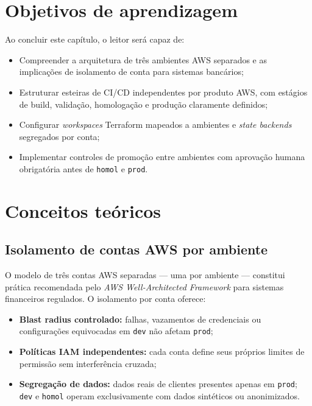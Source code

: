 \section{Objetivos de aprendizagem}

Ao concluir este cap\'itulo, o leitor ser\'a capaz de:

\begin{itemize}[leftmargin=*]
  \item Compreender a arquitetura de tr\^es ambientes AWS separados e
        as implica\c{c}\~oes de isolamento de conta para sistemas banc\'arios;
  \item Estruturar esteiras de CI/CD independentes por produto AWS,
        com est\'agios de build, valida\c{c}\~ao, homologa\c{c}\~ao e
        produ\c{c}\~ao claramente definidos;
  \item Configurar \textit{workspaces} Terraform
        mapeados a ambientes e \textit{state backends}
        segregados por conta;
  \item Implementar controles de promo\c{c}\~ao entre ambientes com
        aprova\c{c}\~ao humana obrigat\'oria antes de \texttt{homol}
        e \texttt{prod}.
\end{itemize}

\section{Conceitos te\'oricos}

\subsection{Isolamento de contas AWS por ambiente}

O modelo de tr\^es contas AWS separadas --- uma por ambiente ---
constitui pr\'atica recomendada pelo \textit{AWS Well-Architected
Framework} para sistemas
financeiros regulados. O isolamento por conta oferece:

\begin{itemize}[leftmargin=*]
  \item \textbf{Blast radius controlado:} falhas, vazamentos de
        credenciais ou configura\c{c}\~oes equivocadas em
        \texttt{dev} n\~ao afetam \texttt{prod};
  \item \textbf{Pol\'iticas IAM independentes:} cada conta
        define seus pr\'oprios limites de permiss\~ao sem interfer\^encia
        cruzada;
  \item \textbf{Segregação de dados:} dados reais de clientes presentes
        apenas em \texttt{prod}; \texttt{dev} e \texttt{homol} operam
        exclusivamente com dados sint\'eticos ou anonimizados.
\end{itemize}


